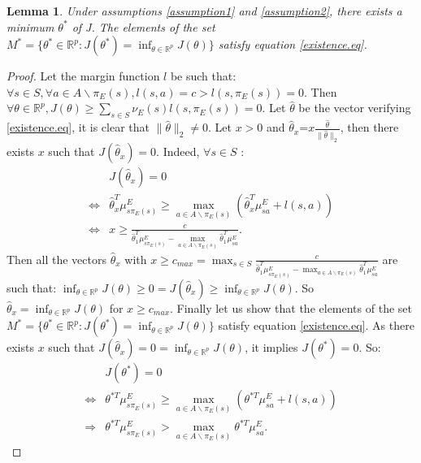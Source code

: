 \documentclass{article}
\newtheorem{lemme}{Lemma}
\begin{document}
\begin{lemme}
\label{proposition1} Under assumptions \ref{assumption1} and
\ref{assumption2}, there exists a minimum $\theta^*$ of J. The
elements of the set $M^*=\{\theta^*\in\mathbb{R}^p:
J(\theta^*)=\inf_{\theta\in\mathbb{R}^p}J(\theta)\}$ satisfy
equation \eqref{existence.eq}.
\end{lemme}
\begin{proof}
Let the margin function $l$ be such that: $\forall s\in S, \forall
a\in A\backslash\pi_E(s), l(s,a)=c>l(s,\pi_E(s))=0$. Then $\forall
\theta\in\mathbb{R}^p,J(\theta)\geq\sum_{s\in
S}\nu_E(s)l(s,\pi_E(s))=0$. Let $\hat{\theta}$ be the vector
verifying \eqref{existence.eq}, it is clear that
$\|\hat{\theta}\|_2\neq0$. Let $x>0$ and
$\hat{\theta}_x$=$x\frac{\hat{\theta}}{\|\hat{\theta}\|_2}$, then
there exists $x$ such that $J(\hat{\theta}_x)=0$. Indeed, $\forall
s\in S$ :
\begin{align}
&J(\hat{\theta}_x)=0\\
\Leftrightarrow&\hat{\theta}_x^T\mu^E_{s\pi_E(s)}\geq\max_{a \in A\backslash\pi_E(s)}(\hat{\theta}_x^T\mu^E_{sa}+l(s,a))\\
\Leftrightarrow&x\geq\frac{c}{\hat{\theta}_1^T\mu^E_{s\pi_E(s)}-\max_{a \in A\backslash\pi_E(s)}\hat{\theta}_1^T\mu^E_{sa}}.
\end{align}
Then all the vectors $\hat{\theta}_x$ with $x\geq c_{max}=\max_{s\in
S}\frac{c}{\hat{\theta}_1^T\mu^E_{s\pi_E(s)}-\max_{a \in
A\backslash\pi_E(s)}\hat{\theta}_1^T\mu^E_{sa}}$ are such that:
$\inf_{\theta\in\mathbb{R}^p}J(\theta)\geq0=J(\hat{\theta}_x)\geq\inf_{\theta\in\mathbb{R}^p}J(\theta)$.
So $\hat{\theta}_x=\inf_{\theta\in\mathbb{R}^p}J(\theta)$ for $x\geq
c_{max}$. Finally let us show that the elements of the set
$M^*=\{\theta^*\in\mathbb{R}^p:
J(\theta^*)=\inf_{\theta\in\mathbb{R}^p}J(\theta)\}$ satisfy
equation \eqref{existence.eq}. As there exists $x$ such that
$J(\hat{\theta}_x)=0=\inf_{\theta\in\mathbb{R}^p}J(\theta)$, it
implies $J(\theta^*)=0$. So:
\begin{align}
&J(\theta^*)=0\\
\Leftrightarrow&\theta^{*T}\mu^E_{s\pi_E(s)}\geq\max_{a \in A\backslash\pi_E(s)}(\theta^{*T}\mu^E_{sa}+l(s,a))\\
\Rightarrow&\theta^{*T}\mu^E_{s\pi_E(s)}>\max_{a \in A\backslash\pi_E(s)}\theta^{*T}\mu^E_{sa}.
\end{align}
\end{proof}
\end{document}
